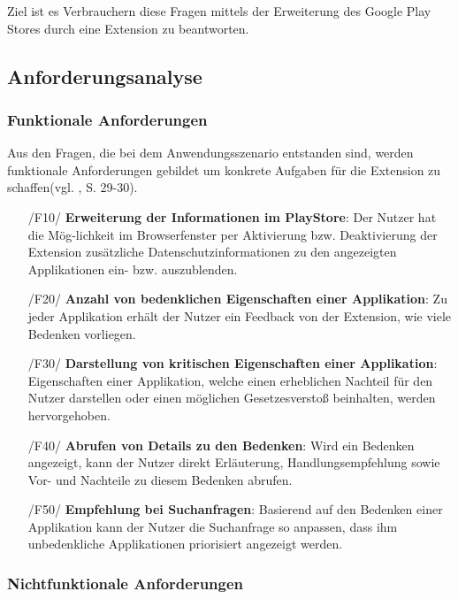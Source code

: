 Ziel ist es Verbrauchern diese Fragen mittels der Erweiterung des Google Play Stores durch eine Extension zu beantworten.

\subsection{Anforderungsanalyse}
\label{ss:anforderungsanalyse}

\subsubsection{Funktionale Anforderungen}
\label{sss:funktionaleanforderungen}
Aus den Fragen, die bei dem Anwendungsszenario entstanden sind, werden funktionale Anforderungen gebildet um konkrete Aufgaben für die Extension zu schaffen(vgl. \cite{eng1}, S. 29-30).


\begin{itemize}
	\item[/F10/] \textbf{Erweiterung der Informationen im PlayStore}:
	Der Nutzer hat die Mög-lichkeit im Browserfenster per Aktivierung bzw. Deaktivierung der Extension zusätzliche Datenschutzinformationen zu den angezeigten Applikationen ein- bzw. auszublenden.
	
	\item[/F20/] \textbf{Anzahl von bedenklichen Eigenschaften einer Applikation}:
	Zu jeder Applikation erhält der Nutzer ein Feedback von der Extension, wie viele Bedenken vorliegen.
	
	\item[/F30/] \textbf{Darstellung von kritischen Eigenschaften einer Applikation}:
	Eigenschaften einer Applikation, welche einen erheblichen Nachteil für den Nutzer darstellen oder einen möglichen Gesetzesverstoß beinhalten, werden hervorgehoben.
	
	\item[/F40/] \textbf{Abrufen von Details zu den Bedenken}:
	Wird ein Bedenken angezeigt, kann der Nutzer direkt Erläuterung, Handlungsempfehlung sowie Vor- und Nachteile zu diesem Bedenken abrufen.
	
	\item[/F50/] \textbf{Empfehlung bei Suchanfragen}:
	Basierend auf den Bedenken einer Applikation kann der Nutzer die Suchanfrage so anpassen, dass ihm unbedenkliche Applikationen priorisiert angezeigt werden.
\end{itemize}

\subsubsection{Nichtfunktionale Anforderungen}

